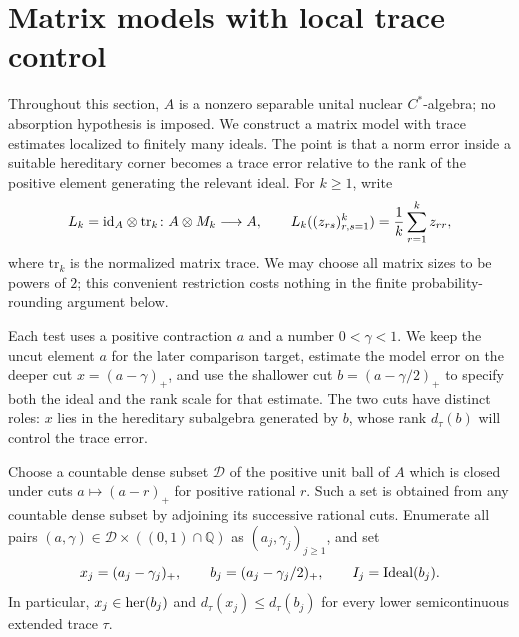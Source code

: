 \section{Matrix models with local trace control}
\label{sec:model}
\label{model:section}

Throughout this section, $A$ is a nonzero separable unital nuclear
$C^*$-algebra; no absorption hypothesis is imposed.  We construct a
matrix model with trace estimates localized to finitely many ideals.  The point is that a norm error
inside a suitable hereditary corner becomes a trace error relative
to the rank of the positive element generating the relevant ideal.
For $k\geq 1$, write
\[
 L_k=\mathrm{id}_A\otimes\mathrm{tr}_k\colon A\otimes M_k\longrightarrow A,
 \qquad
 L_k((z_{rs})_{r,s=1}^k)=\frac1k\sum_{r=1}^k z_{rr},
\]
where $\mathrm{tr}_k$ is the normalized matrix trace.  We may choose
all matrix sizes to be powers of $2$; this convenient restriction
costs nothing in the finite probability-rounding argument below.

Each test uses a positive contraction $a$ and a number $0<\gamma<1$.
We keep the uncut element $a$ for the later comparison target, estimate
the model error on the deeper cut $x=(a-\gamma)_+$, and use the
shallower cut $b=(a-\gamma/2)_+$ to specify both the ideal and the
rank scale for that estimate.  The two cuts have distinct roles:
$x$ lies in the hereditary subalgebra generated by $b$, whose rank
$d_\tau(b)$ will control the trace error.

Choose a countable dense subset $\mathcal D$ of the positive unit ball
of $A$ which is closed under cuts $a\mapsto(a-r)_+$ for positive
rational $r$.  Such a set is obtained from any countable dense subset
by adjoining its successive rational cuts.  Enumerate all pairs
$(a,\gamma)\in\mathcal D\times((0,1)\cap\mathbb Q)$ as
$(a_j,\gamma_j)_{j\geq1}$, and set
\begin{equation}
 \label{model:tests}
 x_j=(a_j-\gamma_j)_+,
 \qquad b_j=(a_j-\gamma_j/2)_+,
 \qquad I_j=\operatorname{Ideal}(b_j).
\end{equation}
In particular, $x_j\in\operatorname{her}(b_j)$ and $d_\tau(x_j)\leq d_\tau(b_j)$
for every lower semicontinuous extended trace $\tau$.

